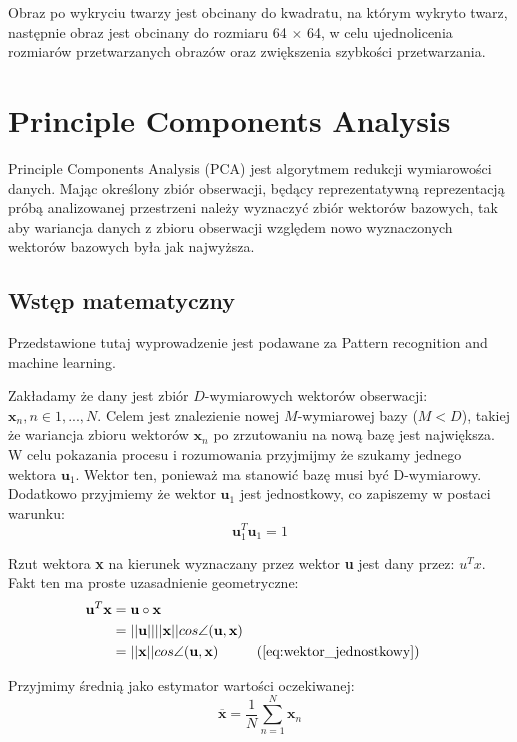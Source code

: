\documentclass[oneside, eng]{mgr}
\newcommand{\bb}{\textbf}
\begin{document}
Obraz po wykryciu twarzy jest obcinany do kwadratu, na którym wykryto twarz, następnie obraz jest obcinany do rozmiaru 64 $\times$ 64, w celu ujednolicenia rozmiarów przetwarzanych obrazów oraz zwiększenia szybkości przetwarzania.
 
\section{Principle Components Analysis}

Principle Components Analysis (PCA) jest algorytmem redukcji wymiarowości danych. Mając określony zbiór obserwacji, będący reprezentatywną reprezentacją próbą analizowanej przestrzeni należy wyznaczyć zbiór wektorów bazowych, tak aby wariancja danych z zbioru obserwacji względem nowo wyznaczonych wektorów bazowych była jak najwyższa.

\subsection{Wstęp matematyczny}

Przedstawione tutaj wyprowadzenie jest podawane za Pattern recognition and machine learning.

Zakładamy że dany jest zbiór $D$-wymiarowych wektorów obserwacji: $\bb{x}_n , n \in 1,...,N $. Celem jest znalezienie nowej $M$-wymiarowej bazy ($M < D$), takiej że wariancja zbioru wektorów $\bb{x}_n$ po zrzutowaniu na nową bazę jest największa. W celu pokazania procesu i rozumowania przyjmijmy że szukamy jednego wektora $\bb{u}_1$. Wektor ten, ponieważ ma stanowić bazę musi być D-wymiarowy. Dodatkowo przyjmiemy że wektor $\bb{u}_1$ jest jednostkowy, co zapiszemy w postaci warunku:
\begin{equation} \label{eq:wektor_jednostkowy}
	\bb{u}_1^{T}\bb{u}_1 = 1
\end{equation}

Rzut wektora \bb{x} na kierunek wyznaczany przez wektor \bb{u} jest dany przez: $u^{T}x$. Fakt ten ma proste uzasadnienie geometryczne:
\begin{align*}	
	\bb{u}^{T} \bb{x} &= \bb{u} \circ \bb{x} \\
		   & = ||\bb{u}|| ||\bb{x}|| cos \angle (\bb{u}, \bb{x}) \index{1} \\
		   &= ||\bb{x}|| cos \angle (\bb{u}, \bb{x}) \index{1} && \text{(\ref{eq:wektor_jednostkowy})}
\end{align*}

Przyjmimy średnią jako estymator wartości oczekiwanej:
\begin{equation}	\overline{\bb{x}} = \frac{1}{N} \sum_{n=1}^{N} \bb{x}_n \end{equation}
\end{document}
